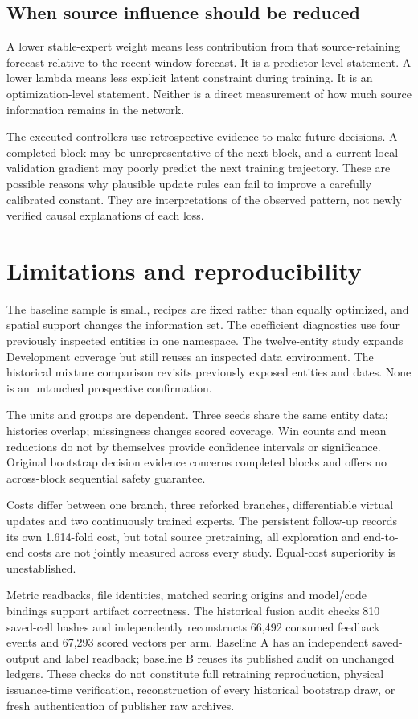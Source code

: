\documentclass[pdflatex,iicol,sn-mathphys-num]{sn-jnl}
\begin{document}
\subsection{When source influence should be reduced}
A lower stable-expert weight means less contribution from that source-retaining forecast relative to the recent-window forecast. It is a predictor-level statement. A lower lambda means less explicit latent constraint during training. It is an optimization-level statement. Neither is a direct measurement of how much source information remains in the network.

The executed controllers use retrospective evidence to make future decisions. A completed block may be unrepresentative of the next block, and a current local validation gradient may poorly predict the next training trajectory. These are possible reasons why plausible update rules can fail to improve a carefully calibrated constant. They are interpretations of the observed pattern, not newly verified causal explanations of each loss.

\section{Limitations and reproducibility}
The baseline sample is small, recipes are fixed rather than equally optimized, and spatial support changes the information set. The coefficient diagnostics use four previously inspected entities in one namespace. The twelve-entity study expands Development coverage but still reuses an inspected data environment. The historical mixture comparison revisits previously exposed entities and dates. None is an untouched prospective confirmation.

The units and groups are dependent. Three seeds share the same entity data; histories overlap; missingness changes scored coverage. Win counts and mean reductions do not by themselves provide confidence intervals or significance. Original bootstrap decision evidence concerns completed blocks and offers no across-block sequential safety guarantee.

Costs differ between one branch, three reforked branches, differentiable virtual updates and two continuously trained experts. The persistent follow-up records its own 1.614-fold cost, but total source pretraining, all exploration and end-to-end costs are not jointly measured across every study. Equal-cost superiority is unestablished.

Metric readbacks, file identities, matched scoring origins and model/code bindings support artifact correctness. The historical fusion audit checks 810 saved-cell hashes and independently reconstructs 66,492 consumed feedback events and 67,293 scored vectors per arm. Baseline A has an independent saved-output and label readback; baseline B reuses its published audit on unchanged ledgers. These checks do not constitute full retraining reproduction, physical issuance-time verification, reconstruction of every historical bootstrap draw, or fresh authentication of publisher raw archives.
\end{document}

